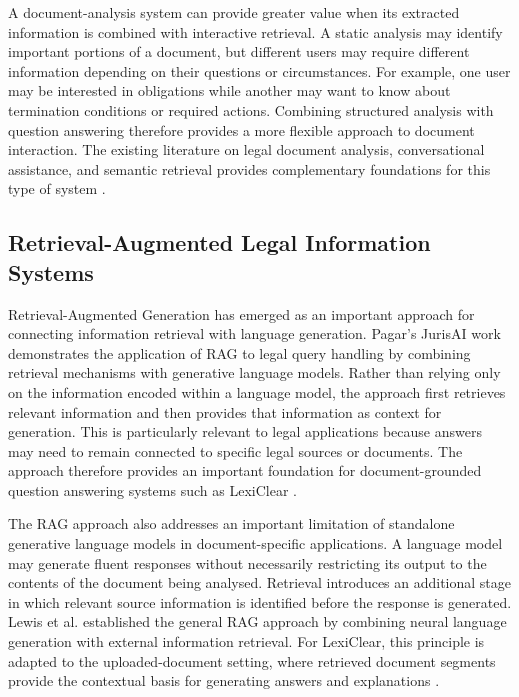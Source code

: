 \documentclass[12pt,a4paper,oneside]{report}
\begin{document}
A document-analysis system can provide greater value when its extracted
information is combined with interactive retrieval. A static analysis may
identify important portions of a document, but different users may require
different information depending on their questions or circumstances. For
example, one user may be interested in obligations while another may want to
know about termination conditions or required actions. Combining structured
analysis with question answering therefore provides a more flexible approach
to document interaction. The existing literature on legal document analysis,
conversational assistance, and semantic retrieval provides complementary
foundations for this type of system
\cite{nethriya2024,kandula2023,reimers2019sbert}.

\subsection{Retrieval-Augmented Legal Information Systems}

Retrieval-Augmented Generation has emerged as an important approach for
connecting information retrieval with language generation. Pagar's JurisAI
work demonstrates the application of RAG to legal query handling by combining
retrieval mechanisms with generative language models. Rather than relying
only on the information encoded within a language model, the approach first
retrieves relevant information and then provides that information as context
for generation. This is particularly relevant to legal applications because
answers may need to remain connected to specific legal sources or documents.
The approach therefore provides an important foundation for document-grounded
question answering systems such as LexiClear
\cite{jurisai2025}.

The RAG approach also addresses an important limitation of standalone
generative language models in document-specific applications. A language
model may generate fluent responses without necessarily restricting its
output to the contents of the document being analysed. Retrieval introduces
an additional stage in which relevant source information is identified before
the response is generated. Lewis et al. established the general RAG approach
by combining neural language generation with external information retrieval.
For LexiClear, this principle is adapted to the uploaded-document setting,
where retrieved document segments provide the contextual basis for generating
answers and explanations
\cite{lewis2020rag,jurisai2025}.
\end{document}
